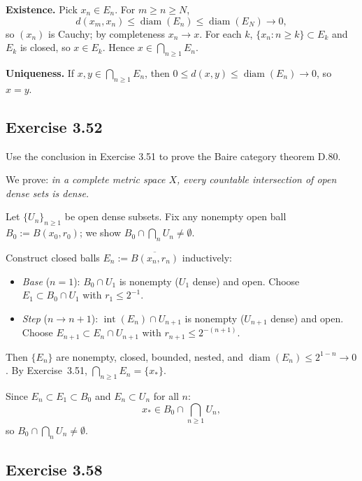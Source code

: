 \documentclass{article}
\begin{document}
\begin{solution}
	\textbf{Existence.}\;
	Pick $x_n\in E_n$.  For $m\ge n\ge N$,
	\[
		d(x_m,x_n)\le\operatorname{diam}(E_n)
		\le\operatorname{diam}(E_N)\to0,
	\]
	so $(x_n)$ is Cauchy; by completeness $x_n\to x$.
	For each $k$, $\{x_n:n\ge k\}\subset E_k$ and $E_k$ is closed,
	so $x\in E_k$.  Hence $x\in\bigcap_{n\ge1}E_n$.

	\medskip

	\textbf{Uniqueness.}\;
	If $x,y\in\bigcap_{n\ge1}E_n$, then
	$0\le d(x,y)\le\operatorname{diam}(E_n)\to0$,
	so $x=y$.\qedhere
\end{solution}

\subsection{Exercise 3.52}

Use the conclusion in Exercise 3.51 to prove the Baire
category theorem D.80.

\begin{solution}
	We prove: \emph{in a complete metric space $X$, every countable
	intersection of open dense sets is dense.}

	Let $\{U_n\}_{n\ge1}$ be open dense subsets.
	Fix any nonempty open ball $B_0:=B(x_0,r_0)$;
	we show $B_0\cap\bigcap_n U_n\neq\emptyset$.

	Construct closed balls $E_n:=\overline{B(x_n,r_n)}$
	inductively:
	\begin{itemize}\setlength\itemsep{2pt}
		\item \emph{Base} ($n=1$):\;
		$B_0\cap U_1$ is nonempty ($U_1$ dense) and open.
		Choose $E_1\subset B_0\cap U_1$ with $r_1\le2^{-1}$.
		\item \emph{Step} ($n\to n{+}1$):\;
		$\operatorname{int}(E_n)\cap U_{n+1}$ is nonempty
		($U_{n+1}$ dense) and open.
		Choose $E_{n+1}\subset E_n\cap U_{n+1}$
		with $r_{n+1}\le2^{-(n+1)}$.
	\end{itemize}
	Then $\{E_n\}$ are nonempty, closed, bounded, nested,
	and $\operatorname{diam}(E_n)\le2^{1-n}\to0$.
	By Exercise~3.51, $\bigcap_{n\ge1}E_n=\{x_*\}$.

	Since $E_n\subset E_1\subset B_0$ and $E_n\subset U_n$
	for all $n$:
	\[
		x_*\in B_0\cap\bigcap_{n\ge1}U_n,
	\]
	so $B_0\cap\bigcap_n U_n\neq\emptyset$.
\end{solution}

\subsection{Exercise 3.58}
\end{document}
